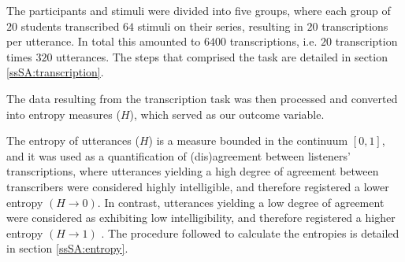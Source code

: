 The participants and stimuli were divided into five groups, where each group of $20$ students transcribed $64$ stimuli on their series, resulting in $20$ transcriptions per utterance. In total this amounted to $6400$ transcriptions, i.e. $20$ transcription times $320$ utterances. The steps that comprised the task are detailed in section \ref{ssSA:transcription}. 

The data resulting from the transcription task was then processed and converted into entropy measures ($H$), which served as our outcome variable. 

The entropy of utterances ($H$) is a measure bounded in the continuum $[0,1]$, and it was used as a quantification of (dis)agreement between listeners' transcriptions, where utterances yielding a high degree of agreement between transcribers were considered highly intelligible, and therefore registered a lower entropy $\left( H \rightarrow 0 \right)$. In contrast, utterances yielding a low degree of agreement were considered as exhibiting low intelligibility, and therefore registered a higher entropy $\left( H \rightarrow 1 \right)$ \citep{Boonen_et_al_2021, Faes_et_al_2021}. The procedure followed to calculate the entropies is detailed in section \ref{ssSA:entropy}.
%
%
